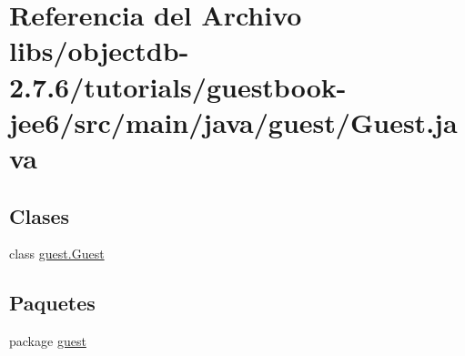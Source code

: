 \hypertarget{guestbook-jee6_2src_2main_2java_2guest_2_guest_8java}{}\section{Referencia del Archivo libs/objectdb-\/2.7.6/tutorials/guestbook-\/jee6/src/main/java/guest/\+Guest.java}
\label{guestbook-jee6_2src_2main_2java_2guest_2_guest_8java}
\subsection*{Clases}
\begin{DoxyCompactItemize}
\item 
class \mbox{\hyperlink{classguest_1_1_guest}{guest.\+Guest}}
\end{DoxyCompactItemize}
\subsection*{Paquetes}
\begin{DoxyCompactItemize}
\item 
package \mbox{\hyperlink{namespaceguest}{guest}}
\end{DoxyCompactItemize}

